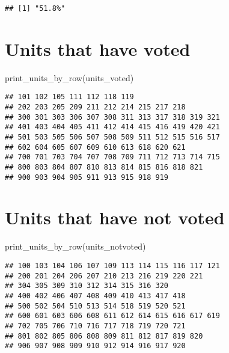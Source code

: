 \documentclass[
  11pt,
]{article}
\newenvironment{Shaded}{\begin{snugshade}}{\end{snugshade}}
\newcommand{\FunctionTok}[1]{\textcolor[rgb]{0.00,0.00,0.00}{#1}}
\newcommand{\NormalTok}[1]{#1}
\begin{document}
\begin{verbatim}
## [1] "51.8%"
\end{verbatim}

\hypertarget{units-that-have-voted}{%
\section{Units that have voted}\label{units-that-have-voted}}

\begin{Shaded}
\begin{Highlighting}[]
\FunctionTok{print\_units\_by\_row}\NormalTok{(units\_voted)}
\end{Highlighting}
\end{Shaded}

\begin{verbatim}
## 101 102 105 111 112 118 119 
## 202 203 205 209 211 212 214 215 217 218 
## 300 301 303 306 307 308 311 313 317 318 319 321 
## 401 403 404 405 411 412 414 415 416 419 420 421 
## 501 503 505 506 507 508 509 511 512 515 516 517 
## 602 604 605 607 609 610 613 618 620 621 
## 700 701 703 704 707 708 709 711 712 713 714 715 
## 800 803 804 807 810 813 814 815 816 818 821 
## 900 903 904 905 911 913 915 918 919
\end{verbatim}

\hypertarget{units-that-have-not-voted}{%
\section{Units that have not voted}\label{units-that-have-not-voted}}

\begin{Shaded}
\begin{Highlighting}[]
\FunctionTok{print\_units\_by\_row}\NormalTok{(units\_notvoted)}
\end{Highlighting}
\end{Shaded}

\begin{verbatim}
## 100 103 104 106 107 109 113 114 115 116 117 121 
## 200 201 204 206 207 210 213 216 219 220 221 
## 304 305 309 310 312 314 315 316 320 
## 400 402 406 407 408 409 410 413 417 418 
## 500 502 504 510 513 514 518 519 520 521 
## 600 601 603 606 608 611 612 614 615 616 617 619 
## 702 705 706 710 716 717 718 719 720 721 
## 801 802 805 806 808 809 811 812 817 819 820 
## 906 907 908 909 910 912 914 916 917 920
\end{verbatim}
\end{document}

